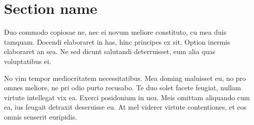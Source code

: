 \documentclass[12pt, a4paper]{report}
\theoremstyle{definition}
\theoremstyle{definition}%
\theoremstyle{definition}%
\theoremstyle{definition}%
\theoremstyle{definition}%
\theoremstyle{definition}%
\begin{document}



\section{Section name}

Duo commodo copiosae ne, nec ei novum meliore constituto, cu mea duis tamquam. Docendi elaboraret in has, hinc principes ex sit. Option inermis elaboraret an sea. Ne sed dicunt salutandi deterruisset, eum alia quas voluptatibus ei.

No vim tempor mediocritatem necessitatibus. Mea doming maluisset eu, no pro omnes meliore, ne pri odio purto recusabo. Te duo solet facete feugiat, nullam virtute intellegat vix ea. Exerci posidonium in usu. Meis omittam aliquando cum ea, ius feugait detraxit deseruisse eu. At mel viderer virtute contentiones, et eos omnis senserit euripidis.










\end{document}
